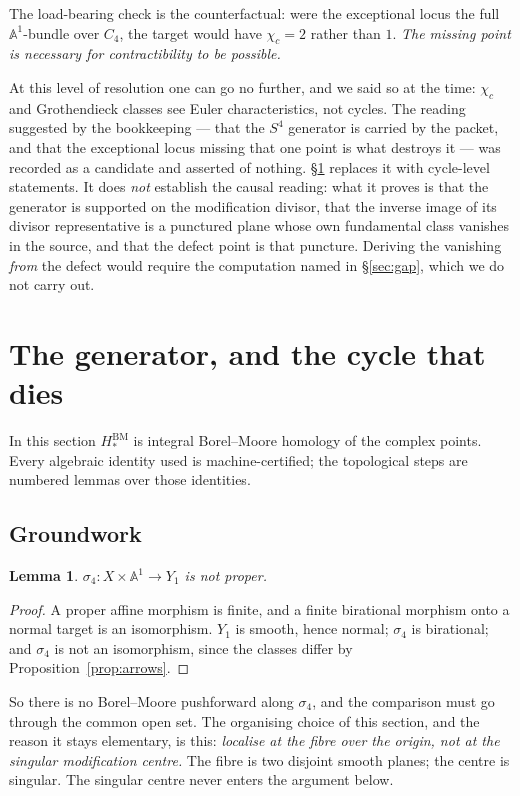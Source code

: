 \documentclass[11pt]{article}
\newtheorem{lemma}[theorem]{Lemma}
\theoremstyle{definition}
\theoremstyle{remark}
\newcommand{\Aff}[1]{\mathbb{A}^{#1}}
\newcommand{\HBM}[1]{H^{\mathrm{BM}}_{#1}}
\newcommand{\chic}{\chi_c}
\begin{document}
The load-bearing check is the counterfactual: were the exceptional locus the
full $\Aff{1}$-bundle over $C_4$, the target would have $\chic=2$ rather than
$1$. \emph{The missing point is necessary for contractibility to be possible.}

At this level of resolution one can go no further, and we said so at the time:
$\chic$ and Grothendieck classes see Euler characteristics, not cycles. The
reading suggested by the bookkeeping --- that the $S^4$ generator is carried
by the packet, and that the exceptional locus missing that one point is what
destroys it --- was recorded as a candidate and asserted of nothing.
\S\ref{sec:generator} replaces it with cycle-level statements. It does
\emph{not} establish the causal reading: what it proves is that the generator
is supported on the modification divisor, that the inverse image of its
divisor representative is a punctured plane whose own fundamental class
vanishes in the source, and that the defect point is that puncture. Deriving
the vanishing \emph{from} the defect would require the computation named in
\S\ref{sec:gap}, which we do not carry out.

\section{The generator, and the cycle that dies}\label{sec:generator}

In this section $\HBM{\ast}$ is integral Borel--Moore homology of the complex
points. Every algebraic identity used is machine-certified; the topological
steps are numbered lemmas over those identities.

\subsection{Groundwork}

\begin{lemma}\label{lem:notproper}
$\sigma_4\colon X\times\Aff{1}\to Y_1$ is \emph{not proper}.
\end{lemma}

\begin{proof}
A proper affine morphism is finite, and a finite birational morphism onto a
normal target is an isomorphism. $Y_1$ is smooth, hence normal; $\sigma_4$ is
birational; and $\sigma_4$ is not an isomorphism, since the classes differ by
Proposition~\ref{prop:arrows}.
\end{proof}

So there is no Borel--Moore pushforward along $\sigma_4$, and the comparison
must go through the common open set. The organising choice of this section,
and the reason it stays elementary, is this: \emph{localise at the fibre over
the origin, not at the singular modification centre.} The fibre is two
disjoint smooth planes; the centre is singular. The singular centre never
enters the argument below.
\end{document}
